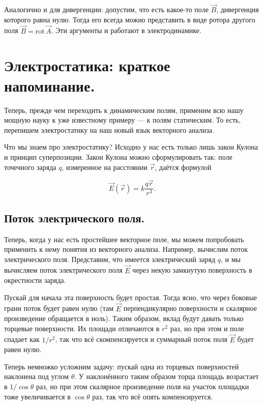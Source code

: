 \documentclass[a4paper,12pt]{article}
\numberwithin{equation}{section}
\newcommand{\rot}{\mathrm{rot}\,}
\begin{document}
Аналогично и для дивергенции: допустим, что есть какое-то поле $\vec{B}$,
дивергенция которого равна нулю. Тогда его всегда можно представить в
виде ротора другого поля $\vec{B} =\rot \vec{A}$. Эти аргументы и работают
в электродинамике. 


\section{Электростатика: краткое напоминание.}
\label{sec:electrostatics}

Теперь, прежде чем переходить к динамическим полям, применим всю нашу
мощную науку к уже известному примеру --- к полям статическим. То
есть, перепишем электростатику на наш новый язык векторного анализа. 

Что мы знаем про электростатику? Исходно у нас есть только лишь закон
Кулона и принцип суперпозиции. Закон Кулона можно сформулировать так:
поле точечного заряда $q$, измеренное на расстоянии $\vec{r}$, даётся
формулой

\begin{equation}
  \label{eq:coulumb_law}
  \vec{E} (\vec{r}) = k \frac{q \vec{r}}{r^3}.
\end{equation}

\subsection{Поток электрического поля.}
\label{sec:flux}

Теперь, когда у нас есть простейшее векторное поле, мы можем
попробовать применить к нему понятия из векторного анализа. Например,
вычислим поток электрического поля. Представим, что имеется
электрический заряд $q$, и мы вычисляем поток электрического поля
$\vec{E}$ через некую замкнутую поверхность в окрестности
заряда. 

Пускай для начала эта поверхность будет простая. Тогда ясно, что через
боковые грани поток будет равен нулю (там $\vec{E}$ перпендикулярно
поверхности и скалярное произведение обращается в ноль). Таким
образом, вклад будут давать только торцевые поверхности. Их площади
отличаются в $r^2$ раз, но при этом и поле спадает как $1/r^2$, так
что всё скомпенсируется и суммарный поток поля $\vec{E}$ будет равен
нулю.

Теперь немножко усложним задачу: пускай одна из торцевых поверхностей
наклонена под углом $\theta$. У наклонённого таким образом торца
площадь возрастает в $1/\cos \theta$ раз, но при этом скалярное
произведение поля на участок площадки тоже увеличивается в $\cos
\theta$ раз, так что всё опять компенсируется. 
\end{document}
